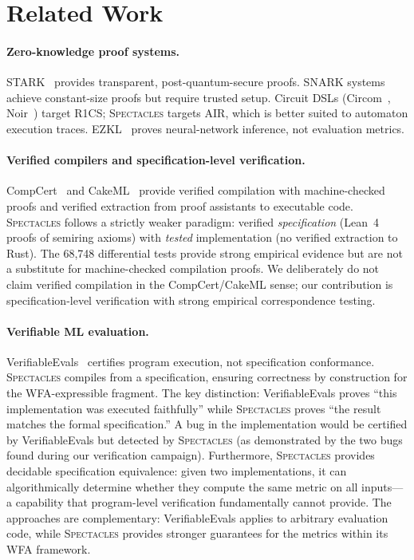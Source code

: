 \documentclass[11pt]{article}
\newcommand{\spectacles}{\textsc{Spectacles}}
\begin{document}
\section{Related Work}\label{sec:related}

\paragraph{Zero-knowledge proof systems.}
STARK~\cite{bensasson2018stark} provides transparent, post-quantum-secure
proofs.  SNARK systems~\cite{groth2016snark} achieve constant-size proofs
but require trusted setup.  Circuit DSLs (Circom~\cite{belles2022circom},
Noir~\cite{noir2023}) target R1CS; \spectacles{} targets AIR, which
is better suited to automaton execution traces.
EZKL~\cite{kang2024ezkl} proves neural-network inference, not
evaluation metrics.

\paragraph{Verified compilers and specification-level verification.}
CompCert~\cite{leroy2009compcert} and CakeML~\cite{kumar2014cakeml}
provide verified compilation with machine-checked proofs and verified
extraction from proof assistants to executable code.  \spectacles{}
follows a strictly weaker paradigm: verified \emph{specification} (Lean~4 proofs
of semiring axioms) with \emph{tested} implementation (no verified
extraction to Rust).  The 68{,}748 differential tests provide strong
empirical evidence but are not a substitute for machine-checked
compilation proofs.  We deliberately do not claim verified compilation in
the CompCert/CakeML sense; our contribution is specification-level
verification with strong empirical correspondence testing.

\paragraph{Verifiable ML evaluation.}
VerifiableEvals~\cite{south2024verifiableevals} certifies program
execution, not specification conformance.  \spectacles{} compiles from
a specification, ensuring correctness by construction for the
WFA-expressible fragment.  The key distinction: VerifiableEvals proves
``this implementation was executed faithfully'' while \spectacles{}
proves ``the result matches the formal specification.''  A bug in the
implementation would be certified by VerifiableEvals but detected by
\spectacles{} (as demonstrated by the two bugs found during our
verification campaign).  Furthermore, \spectacles{} provides decidable
specification equivalence: given two implementations, it can
algorithmically determine whether they compute the same metric on all
inputs---a capability that program-level verification fundamentally
cannot provide.  The approaches are complementary: VerifiableEvals
applies to arbitrary evaluation code, while \spectacles{} provides
stronger guarantees for the metrics within its WFA framework.
\end{document}
